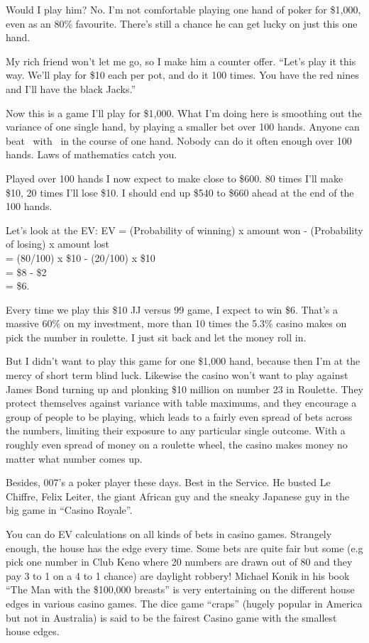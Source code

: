 Would I play him? No. I'm not comfortable playing one hand of poker
for \$1,000, even as an 80\% favourite. There's still a chance he can get
lucky on just this one hand.

My rich friend won't let me go, so I make him a counter offer.
``Let's play it this way. We'll play for \$10 each per pot, and do
it 100 times. You have the red nines and I'll have the black Jacks.''

Now this is a game I'll play for \$1,000. What I'm doing here is smoothing
out the variance of one single hand, by playing a smaller bet over
100 hands. Anyone can beat \Jc\Js\ with \nineh\nined\ in the course of one
hand. Nobody can do it often enough over 100 hands. Laws of mathematics
catch you.

Played over 100 hands I now expect to make close to \$600. 80 times I'll
make \$10, 20 times I'll lose \$10. I should end up \$540 to \$660 ahead
at the end of the 100 hands.

Let's look at the EV:
EV = (Probability of winning) x amount won - (Probability of losing) x
amount lost \\
   = (80/100) x \$10 - (20/100) x \$10 \\
   = \$8 - \$2 \\
   = \$6.

Every time we play this \$10 JJ versus 99 game, I expect to win \$6. That's a
massive 60\% on my investment, more than 10 times the 5.3\% casino makes on
pick the number in roulette. I just sit back and let the money roll in.

But I didn't want to play this game for one \$1,000 hand, because then
I'm at the mercy of short term blind luck. Likewise the casino won't
want to play against James Bond turning up and plonking \$10 million
on number 23 in Roulette. They protect themselves against variance
with table maximums, and they encourage a group of people to be playing,
which leads to a fairly even spread of bets across the numbers, limiting
their exposure to any particular single outcome. With a roughly even spread
of money on a roulette wheel, the casino makes money no matter what
number comes up.

Besides, 007's a poker player these days. Best in the Service.
He busted Le Chiffre, Felix Leiter, the giant African guy and
the sneaky Japanese guy in the big game in ``Casino Royale''.

You can do EV calculations on all kinds of bets in casino games.
Strangely enough, the house has the edge every time. Some bets
are quite fair but some (e.g pick one number in Club Keno
where 20 numbers are drawn out of 80 and they pay
3 to 1 on a 4 to 1 chance) are daylight robbery! Michael Konik
in his book ``The Man with the \$100,000 breasts'' is very entertaining on the
different house edges in various casino games. The dice game ``craps''
(hugely popular in America but not in Australia) is said to be
the fairest Casino game with the smallest house edges.

